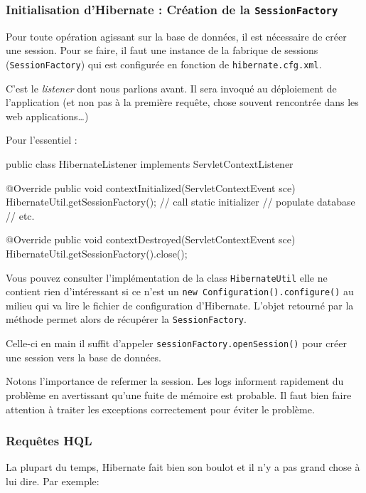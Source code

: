 \cprotect\subsubsection{Initialisation d'Hibernate : Création de la \verb|SessionFactory|}

Pour toute opération agissant sur la base de données, il est nécessaire de créer une session.
Pour se faire, il faut une instance de la fabrique de sessions (\verb|SessionFactory|) qui 
est configurée en fonction de \verb|hibernate.cfg.xml|.

C'est le \emph{listener} dont nous parlions avant. Il sera invoqué au déploiement de l'application
(et non pas à la première requête, chose souvent rencontrée dans les web applications\dots)

Pour l'essentiel :

\begin{javacode}
public class HibernateListener implements ServletContextListener {

    @Override
    public void contextInitialized(ServletContextEvent sce) {
        HibernateUtil.getSessionFactory();  // call static initializer
        // populate database
        // etc.
    }

    @Override
    public void contextDestroyed(ServletContextEvent sce) {
        HibernateUtil.getSessionFactory().close();
    }
}
\end{javacode}

Vous pouvez consulter l'implémentation de la class \verb|HibernateUtil| elle ne contient rien d'intéressant
si ce n'est un \verb|new Configuration().configure()| au milieu qui va lire le fichier de configuration
d'Hibernate. L'objet retourné par la méthode permet alors de récupérer la \verb|SessionFactory|.

Celle-ci en main il suffit d'appeler \verb|sessionFactory.openSession()| pour créer une session vers la 
base de données.

Notons l'importance de refermer la session. Les logs informent rapidement du problème en avertissant
qu'une fuite de mémoire est probable. Il faut bien faire attention à traiter les exceptions correctement
pour éviter le problème.

\subsubsection{Requêtes HQL}

La plupart du temps, Hibernate fait bien son boulot et il n'y a pas grand chose à lui dire. Par exemple:

